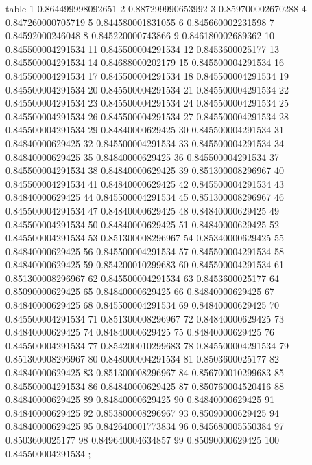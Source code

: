 table {%
	1 0.864499998092651
	2 0.887299990653992
	3 0.859700002670288
	4 0.847260000705719
	5 0.844580001831055
	6 0.845660002231598
	7 0.84592000246048
	8 0.845220000743866
	9 0.846180002689362
	10 0.845500004291534
	11 0.845500004291534
	12 0.8453600025177
	13 0.845500004291534
	14 0.84688000202179
	15 0.845500004291534
	16 0.845500004291534
	17 0.845500004291534
	18 0.845500004291534
	19 0.845500004291534
	20 0.845500004291534
	21 0.845500004291534
	22 0.845500004291534
	23 0.845500004291534
	24 0.845500004291534
	25 0.845500004291534
	26 0.845500004291534
	27 0.845500004291534
	28 0.845500004291534
	29 0.84840000629425
	30 0.845500004291534
	31 0.84840000629425
	32 0.845500004291534
	33 0.845500004291534
	34 0.84840000629425
	35 0.84840000629425
	36 0.845500004291534
	37 0.845500004291534
	38 0.84840000629425
	39 0.851300008296967
	40 0.845500004291534
	41 0.84840000629425
	42 0.845500004291534
	43 0.84840000629425
	44 0.845500004291534
	45 0.851300008296967
	46 0.845500004291534
	47 0.84840000629425
	48 0.84840000629425
	49 0.845500004291534
	50 0.84840000629425
	51 0.84840000629425
	52 0.845500004291534
	53 0.851300008296967
	54 0.85340000629425
	55 0.84840000629425
	56 0.845500004291534
	57 0.845500004291534
	58 0.84840000629425
	59 0.854200010299683
	60 0.845500004291534
	61 0.851300008296967
	62 0.845500004291534
	63 0.8453600025177
	64 0.85090000629425
	65 0.84840000629425
	66 0.84840000629425
	67 0.84840000629425
	68 0.845500004291534
	69 0.84840000629425
	70 0.845500004291534
	71 0.851300008296967
	72 0.84840000629425
	73 0.84840000629425
	74 0.84840000629425
	75 0.84840000629425
	76 0.845500004291534
	77 0.854200010299683
	78 0.845500004291534
	79 0.851300008296967
	80 0.848000004291534
	81 0.8503600025177
	82 0.84840000629425
	83 0.851300008296967
	84 0.856700010299683
	85 0.845500004291534
	86 0.84840000629425
	87 0.850760004520416
	88 0.84840000629425
	89 0.84840000629425
	90 0.84840000629425
	91 0.84840000629425
	92 0.853800008296967
	93 0.85090000629425
	94 0.84840000629425
	95 0.842640001773834
	96 0.845680005550384
	97 0.8503600025177
	98 0.849640004634857
	99 0.85090000629425
	100 0.845500004291534
};
